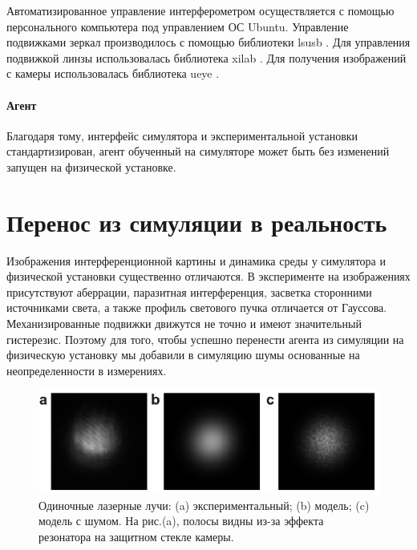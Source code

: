 Автоматизированное управление интерферометром осуществляется с помощью персонального компьютера под управлением ОС Ubuntu. Управление подвижками зеркал производилось с помощью библиотеки lsusb \cite{lsusb}. Для управления подвижкой линзы использовалась библиотека xilab \cite{standa_soft}. Для получения изображений с камеры использовалась библиотека ueye \cite{ids_soft}. 


\paragraph{Агент}

Благодаря тому, интерфейс симулятора и экспериментальной установки стандартизирован, агент обученный на симуляторе может быть без изменений запущен на физической установке. 


\section{Перенос из симуляции в реальность}\label{sec:ch2/sec6}

Изображения интерференционной картины и динамика среды у симулятора и физической установки существенно отличаются. В эксперименте на изображениях присутствуют аберрации, паразитная интерференция, засветка сторонними источниками света, а также профиль светового пучка отличается от Гауссова. Механизированные подвижки движутся не точно и имеют значительный гистерезис. Поэтому для того, чтобы успешно перенести агента из симуляции на физическую установку  мы добавили в симуляцию шумы основанные на неопределенности в измерениях.

\begin{figure}
\centering
  \includegraphics[width=0.8\linewidth]{images/beamsamples.pdf}

\caption{Одиночные лазерные лучи: (a) экспериментальный; (b) модель; (c) модель с шумом. На рис.(a), полосы видны из-за эффекта резонатора на защитном стекле камеры.}
\label{fig:rad_fit}
\end{figure}



